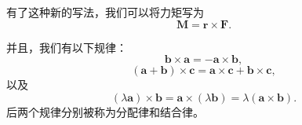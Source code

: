 有了这种新的写法，我们可以将力矩写为
\begin{equation}
    \boldsymbol{M}=\boldsymbol{r}\times\boldsymbol{F}.
\end{equation}

并且，我们有以下规律：
\begin{equation}
    \boldsymbol{b}\times\boldsymbol{a}=-\boldsymbol{a}\times
    \boldsymbol{b},
\end{equation}
\begin{equation}
    (\boldsymbol{a}+\boldsymbol{b})\times \boldsymbol{c}
    =\boldsymbol{a}\times \boldsymbol{c}+\boldsymbol{b}\times
    \boldsymbol{c},
\end{equation}
以及 
\begin{equation}
    (\lambda\boldsymbol{a})\times\boldsymbol{b}=
    \boldsymbol{a}\times (\lambda \boldsymbol{b})
    =\lambda(\boldsymbol{a}\times \boldsymbol{b}).
\end{equation}
后两个规律分别被称为分配律和结合律。
